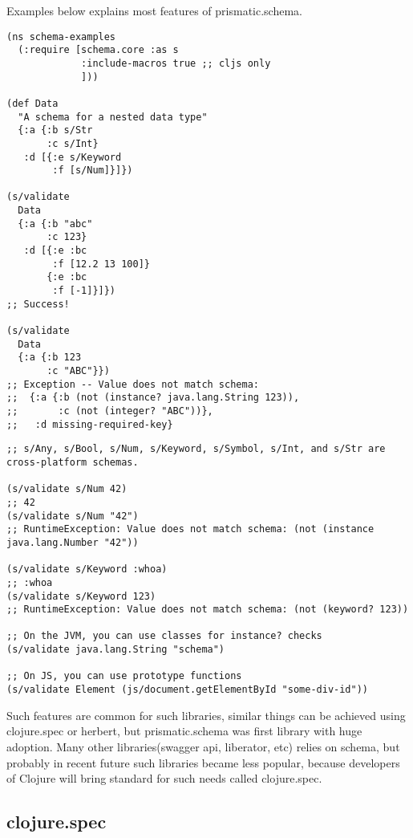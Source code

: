 Examples below explains most features of prismatic.schema.

\begin{verbatim}
(ns schema-examples
  (:require [schema.core :as s
             :include-macros true ;; cljs only
             ]))

(def Data
  "A schema for a nested data type"
  {:a {:b s/Str
       :c s/Int}
   :d [{:e s/Keyword
        :f [s/Num]}]})

(s/validate
  Data
  {:a {:b "abc"
       :c 123}
   :d [{:e :bc
        :f [12.2 13 100]}
       {:e :bc
        :f [-1]}]})
;; Success!

(s/validate
  Data
  {:a {:b 123
       :c "ABC"}})
;; Exception -- Value does not match schema:
;;  {:a {:b (not (instance? java.lang.String 123)),
;;       :c (not (integer? "ABC"))},
;;   :d missing-required-key}
\end{verbatim}

\begin{verbatim}
;; s/Any, s/Bool, s/Num, s/Keyword, s/Symbol, s/Int, and s/Str are cross-platform schemas.

(s/validate s/Num 42)
;; 42
(s/validate s/Num "42")
;; RuntimeException: Value does not match schema: (not (instance java.lang.Number "42"))

(s/validate s/Keyword :whoa)
;; :whoa
(s/validate s/Keyword 123)
;; RuntimeException: Value does not match schema: (not (keyword? 123))

;; On the JVM, you can use classes for instance? checks
(s/validate java.lang.String "schema")

;; On JS, you can use prototype functions
(s/validate Element (js/document.getElementById "some-div-id"))
\end{verbatim}
Such features are common for such libraries, similar things can be achieved
using clojure.spec or herbert, but prismatic.schema was first library with huge
adoption. Many other libraries(swagger api, liberator, etc) relies on schema,
but probably in recent future such libraries became less popular, because
developers of Clojure will bring standard for such needs called clojure.spec.

\subsection{clojure.spec}


